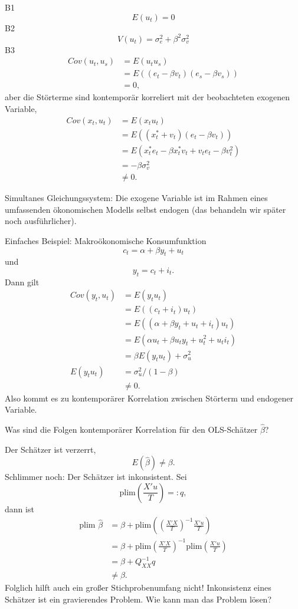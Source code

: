 \documentclass{article}
\begin{document}
B1
\[ E(u_{t})=0 \]
B2
\[ V(u_{t})=\sigma _{e}^{2}+\beta ^{2}\sigma _{v}^{2} \]
B3
\begin{align*}
Cov(u_{t},u_{s}) &=E(u_{t}u_{s}) \\
&=E\left( \left( e_{t}-\beta v_{t}\right) \left( e_{s}-\beta v_{s}\right)\right) \\
&=0,
\end{align*}
aber die Störterme sind kontemporär korreliert mit der beobachteten
exogenen Variable,
\begin{align*}
Cov(x_{t},u_{t}) &=E\left( x_{t}u_{t}\right) \\
&=E\left( \left( x_{t}^{\ast }+v_{t}\right) \left( e_{t}-\beta v_{t}\right)\right) \\
&=E\left( x_{t}^{\ast }e_{t}-\beta x_{t}^{\ast }v_{t}+v_{t} e_{t}-\beta v_{t}^{2}\right) \\
&=-\beta \sigma _{v}^{2} \\
&\neq 0.
\end{align*}

Simultanes Gleichungssystem: Die exogene Variable ist im Rahmen eines umfassenden
ökonomischen Modells selbst endogen (das behandeln wir später noch ausführlicher).

Einfaches Beispiel: Makroökonomische Konsumfunktion
\[ c_{t}=\alpha +\beta y_{t}+u_{t} \]
und
\[ y_{t}=c_{t}+i_{t}. \]%
Dann gilt
\begin{align*}
Cov\left( y_{t},u_{t}\right) &=E\left( y_{t}u_{t}\right) \\
&=E\left( \left( c_{t}+i_{t}\right) u_{t}\right) \\
&=E\left( \left( \alpha +\beta y_{t}+u_{t}+i_{t}\right) u_{t}\right) \\
&=E\left( \alpha u_{t}+\beta u_{t}y_{t}+u_{t}^{2}+u_{t}i_{t}\right) \\
&=\beta E(y_{t}u_{t})+\sigma _{u}^{2} \\
E\left( y_{t}u_{t}\right) &=\sigma _{u}^{2}/\left( 1-\beta \right) \\
&\neq 0.
\end{align*}
Also kommt es zu kontemporärer Korrelation zwischen Störterm und
endogener Variable.

Was sind die Folgen kontemporärer Korrelation für den OLS-Schätzer $\hat{\beta}$?

Der Schätzer ist verzerrt,
\[ E(\hat{\beta}) \neq \beta. \]
Schlimmer noch: Der Schätzer ist  inkonsistent. Sei
\[ \textrm{plim}\left( \frac{X'u}{T}\right) =:q, \]
dann ist
\begin{align*}
\textrm{plim }\hat\beta &=\beta +\textrm{plim}\left( \left( \frac{X'X}{T}\right) ^{-1}\frac{X'u}{T}\right) \\
&=\beta +\textrm{plim}\left( \frac{X'X}{T}\right) ^{-1}\textrm{plim}\left( \frac{X'u}{T}\right) \\
&=\beta +Q_{XX}^{-1}q \\
&\neq \beta .
\end{align*}
Folglich hilft auch ein großer Stichprobenumfang nicht! Inkonsistenz
eines Schätzer ist ein gravierendes Problem. Wie kann man das
Problem lösen?
\end{document}
